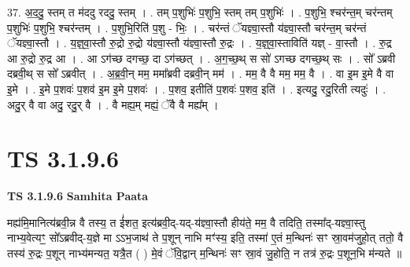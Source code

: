 \documentclass[17pt]{extarticle}
\begin{document}
37. अ॒द॒दु॒ स्तम् त म॑ददु रददु॒ स्तम् । . तम् प॒शुभिः॑ प॒शुभि॒ स्तम् तम् प॒शुभिः॑ । . प॒शुभि॒ श्चर॑न्त॒म् चर॑न्तम् प॒शुभिः॑ प॒शुभि॒ श्चर॑न्तम् । . प॒शुभि॒रिति॑ प॒शु - भिः॒ । . चर॑न्तं ॅयज्ञ्वा॒स्तौ य॑ज्ञ्वा॒स्तौ चर॑न्त॒म् चर॑न्तं ॅयज्ञ्वा॒स्तौ । . य॒ज्ञ्॒वा॒स्तौ रु॒द्रो रु॒द्रो य॑ज्ञ्वा॒स्तौ य॑ज्ञ्वा॒स्तौ रु॒द्रः । . य॒ज्ञ्॒वा॒स्ताविति॑ यज्ञ् - वा॒स्तौ । . रु॒द्र आ रु॒द्रो रु॒द्र आ । . आ ऽग॑च्छ दगच्छ॒ दा ऽग॑च्छत् । . अ॒ग॒च्छ॒थ् स सो॑ ऽगच्छ दगच्छ॒थ् सः । . सो᳚ ऽब्रवी दब्रवी॒थ् स सो᳚ ऽब्रवीत् । . अ॒ब्र॒वी॒न् मम॒ ममा᳚ब्रवी दब्रवी॒न् मम॑ । . मम॒ वै वै मम॒ मम॒ वै । . वा इ॒म इ॒मे वै वा इ॒मे । . इ॒मे प॒शवः॑ प॒शव॑ इ॒म इ॒मे प॒शवः॑ । . प॒शव॒ इतीति॑ प॒शवः॑ प॒शव॒ इति॑ । . इत्यदु॒ रदु॒रिती त्यदुः॑ । . अदु॒र् वै वा अदु॒ रदु॒र् वै । . वै मह्य॒म् मह्यं॒ ॅवै वै मह्य᳚म् । \newline
\pagebreak
{}

\section{ TS 3.1.9.6 }

\textbf{TS 3.1.9.6 } \newline
\textbf{Samhita Paata} \newline

मह्य॑मि॒मानित्य॑ब्रवी॒न्न वै तस्य॒ त ई॑शत॒ इत्य॑ब्रवी॒द्-यद्-य॑ज्ञ्वा॒स्तौ हीय॑ते॒ मम॒ वै तदिति॒ तस्मा᳚द्-यज्ञ्वा॒स्तु नाभ्य॒वेत्यꣳ॒॒ सो᳚ऽब्रवीद्-य॒ज्ञे मा ऽऽभ॒जाथ॑ ते प॒शून् नाभि मꣳ॑स्य॒ इति॒ तस्मा॑ ए॒तं म॒न्थिनः॑ सꣳ स्रा॒वम॑जुहो॒त् ततो॒ वै तस्य॑ रु॒द्रः प॒शून् नाभ्य॑मन्यत॒ यत्रै॒त ( ) मे॒वं ॅवि॒द्वान् म॒न्थिनः॑ सꣳ स्रा॒वं जु॒होति॒ न तत्र॑ रु॒द्रः प॒शून॒भि म॑न्यते ॥ \newline
\end{document}
